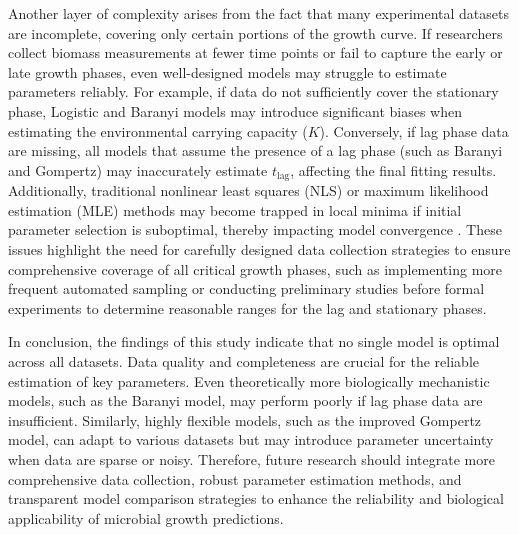 \documentclass[12pt]{article}
\begin{document}
Another layer of complexity arises from the fact that many experimental datasets are incomplete, covering only certain portions of the growth curve. If researchers collect biomass measurements at fewer time points or fail to capture the early or late growth phases, even well-designed models may struggle to estimate parameters reliably. For example, if data do not sufficiently cover the stationary phase, Logistic and Baranyi models may introduce significant biases when estimating the environmental carrying capacity ($K$). Conversely, if lag phase data are missing, all models that assume the presence of a lag phase (such as Baranyi and Gompertz) may inaccurately estimate $t_{\text{lag}}$, affecting the final fitting results. Additionally, traditional nonlinear least squares (NLS) or maximum likelihood estimation (MLE) methods may become trapped in local minima if initial parameter selection is suboptimal, thereby impacting model convergence \citep{BurnhamAnderson2002}. These issues highlight the need for carefully designed data collection strategies to ensure comprehensive coverage of all critical growth phases, such as implementing more frequent automated sampling or conducting preliminary studies before formal experiments to determine reasonable ranges for the lag and stationary phases.

In conclusion, the findings of this study indicate that no single model is optimal across all datasets. Data quality and completeness are crucial for the reliable estimation of key parameters. Even theoretically more biologically mechanistic models, such as the Baranyi model, may perform poorly if lag phase data are insufficient. Similarly, highly flexible models, such as the improved Gompertz model, can adapt to various datasets but may introduce parameter uncertainty when data are sparse or noisy. Therefore, future research should integrate more comprehensive data collection, robust parameter estimation methods, and transparent model comparison strategies to enhance the reliability and biological applicability of microbial growth predictions.

\end{document}
